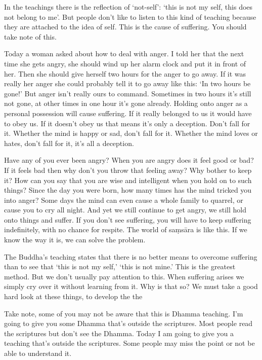 In the teachings there is the reflection of `not-self': `this is not my self, this does not belong to me'. But people don't like to listen to this kind of teaching because they are attached to the idea of self. This is the cause of suffering. You should take note of this.

Today a woman asked about how to deal with anger. I told her that the next time she gets angry, she should wind up her alarm clock and put it in front of her. Then she should give herself two hours for the anger to go away. If it was really her anger she could probably tell it to go away like this: `In two hours be gone!' But anger isn't really ours to command. Sometimes in two hours it's still not gone, at other times in one hour it's gone already. Holding onto anger as a personal possession will cause suffering. If it really belonged to us it would have to obey us. If it doesn't obey us that means it's only a deception. Don't fall for it. Whether the mind is happy or sad, don't fall for it. Whether the mind loves or hates, don't fall for it, it's all a deception.

Have any of you ever been angry? When you are angry does it feel good or bad? If it feels bad then why don't you throw that feeling away? Why bother to keep it? How can you say that you are wise and intelligent when you hold on to such things? Since the day you were born, how many times has the mind tricked you into anger? Some days the mind can even cause a whole family to quarrel, or cause you to cry all night. And yet we still continue to get angry, we still hold onto things and suffer. If you don't see suffering, you will have to keep suffering indefinitely, with no chance for respite. The world of sa\d{m}s\=ara is like this. If we know the way it is, we can solve the problem.

The Buddha's teaching states that there is no better means to overcome suffering than to see that `this is not my self,' `this is not mine.' This is the greatest method. But we don't usually pay attention to this. When suffering arises we simply cry over it without learning from it. Why is that so? We must take a good hard look at these things, to develop the  the 

Take note, some of you may not be aware that this is Dhamma teaching. I'm going to give you some Dhamma that's outside the scriptures. Most people read the scriptures but don't see the Dhamma. Today I am going to give you a teaching that's outside the scriptures. Some people may miss the point or not be able to understand it.

